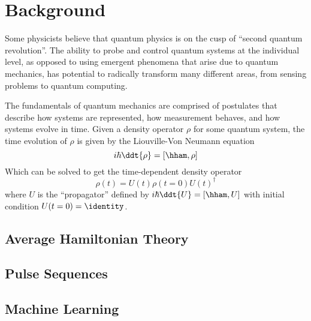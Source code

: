 \chapter{Background}


Some physicists believe that quantum physics is on the cusp of ``second quantum revolution''\cite{quantum-rev}. The ability to probe and control quantum systems at the individual level, as opposed to using emergent phenomena that arise due to quantum mechanics, has potential to radically transform many different areas, from sensing problems to quantum computing.

The fundamentals of quantum mechanics are comprised of postulates that describe how systems are represented, how measurement behaves, and how systems evolve in time.
Given a density operator $\rho$ for some quantum system, the time evolution of $\rho$ is given by the Liouville-Von Neumann equation
\begin{equation}
    i\hbar \ddt{\rho} = [\hham, \rho]
\end{equation}
Which can be solved to get the time-dependent density operator
\begin{equation}
    \rho(t) = U(t) \rho(t=0) U(t)^\dagger
\end{equation}
where $U$ is the ``propagator'' defined by $i\hbar \ddt{U} = [\hham, U]$ with initial condition $U(t=0) = \identity$.

\section{Average Hamiltonian Theory}


\section{Pulse Sequences}


\section{Machine Learning}

